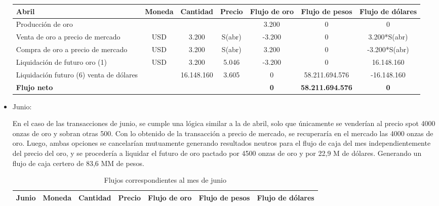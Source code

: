 \documentclass{article}
\theoremstyle{remark}
\theoremstyle{definition}
\begin{document}
\begin{itemize}
\begin{table}[H]
\begin{tabular}{l|c c c|c c c}
\toprule
\textbf{Abril} & 
\textbf{Moneda} & 
\textbf{Cantidad} & 
\textbf{Precio} & 
\textbf{Flujo de oro} & 
\textbf{Flujo de pesos} & 
\textbf{Flujo de dólares} \\
\midrule

Producción de oro 
&  
&  
&  
& 3.200 
& 0 
& 0 \\

Venta de oro a precio de mercado 
& USD 
& 3.200 
& S(abr) 
& -3.200 
& 0 
& 3.200*S(abr) \\

Compra de oro a precio de mercado 
& USD 
& 3.200 
& S(abr) 
& 3.200 
& 0 
& -3.200*S(abr) \\

Liquidación de futuro oro (1) 
& USD 
& 3.200 
& 5.046 
& -3.200 
& 0 
& 16.148.160 \\

Liquidación futuro (6) venta de dólares 
&  
& 16.148.160 
& 3.605 
& 0 
& 58.211.694.576 
& -16.148.160 \\

\midrule

\textbf{Flujo neto} 
& \textbf{} 
& \textbf{} 
& \textbf{} 
& \textbf{0} 
& \textbf{58.211.694.576} 
& \textbf{0} \\

\bottomrule
\end{tabular}
\end{table}


\item Junio:

En el caso de las transacciones de junio, se cumple una lógica similar a la de abril, solo que únicamente se venderían al precio spot 4000 onzas de oro y sobran otras 500. Con lo obtenido de la transacción a precio de mercado, se recuperaría en el mercado las 4000 onzas de oro. Luego, ambas opciones se cancelarían mutuamente generando resultados neutros para el flujo de caja del mes independientemente del precio del oro, y se procedería a liquidar el futuro de oro pactado por 4500 onzas de oro y por 22,9 M de dólares. Generando un flujo de caja certero de 83,6 MM de pesos.

\begin{table}[H]
\centering
\caption{Flujos correspondientes al mes de junio}
\footnotesize
\renewcommand{\arraystretch}{1.2}

\begin{tabular}{l|c c c|c c c}
\toprule
\textbf{Junio} & 
\textbf{Moneda} & 
\textbf{Cantidad} & 
\textbf{Precio} & 
\textbf{Flujo de oro} & 
\textbf{Flujo de pesos} & 
\textbf{Flujo de dólares} \\
\midrule


\end{tabular}
\end{table}
\end{itemize}
\end{document}
